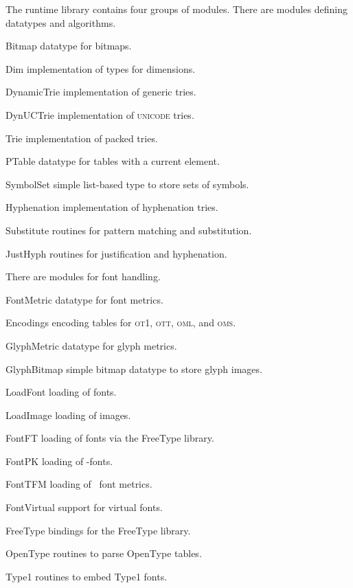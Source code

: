 The runtime library contains four groups of modules. There are modules defining datatypes and algorithms.
\begin{description}
%
\item{\textsf{\red Bitmap}}%
  datatype for bitmaps.
\item{\textsf{\red Dim}}%
  implementation of types for dimensions.
\item{\textsf{\red DynamicTrie}}%
  implementation of generic tries.
\item{\textsf{\red DynUCTrie}}%
  implementation of \textsc{unicode} tries.
\item{\textsf{\red Trie}}%
  implementation of packed tries.
\item{\textsf{\red PTable}}%
  datatype for tables with a current element.
\item{\textsf{\red SymbolSet}}%
  simple list-based type to store sets of symbols.
\item{\textsf{\red Hyphenation}}%
  implementation of hyphenation tries.
\item{\textsf{\red Substitute}}%
  routines for pattern matching and substitution.
\item{\textsf{\red JustHyph}}%
  routines for justification and hyphenation.
\end{description}
There are modules for font handling.
\begin{description}
%
\item{\textsf{\red FontMetric}}%
  datatype for font metrics.
\item{\textsf{\red Encodings}}%
  encoding tables for \textsc{ot1}, \textsc{ott}, \textsc{oml}, and \textsc{oms}.
\item{\textsf{\red GlyphMetric}}%
  datatype for glyph metrics.
\item{\textsf{\red GlyphBitmap}}%
  simple bitmap datatype to store glyph images.
\item{\textsf{\red LoadFont}}%
  loading of fonts.
\item{\textsf{\red LoadImage}}%
  loading of images.
\item{\textsf{\red FontFT}}%
  loading of fonts via the FreeType library.
\item{\textsf{\red FontPK}}%
  loading of \pk-fonts.
\item{\textsf{\red FontTFM}}%
  loading of \tfm\ font metrics.
\item{\textsf{\red FontVirtual}}%
  support for virtual fonts.
\item{\textsf{\red FreeType}}%
  bindings for the FreeType library.
\item{\textsf{\red OpenType}}%
  routines to parse OpenType tables.
\item{\textsf{\red Type1}}%
  routines to embed Type1 fonts.
\end{description}
